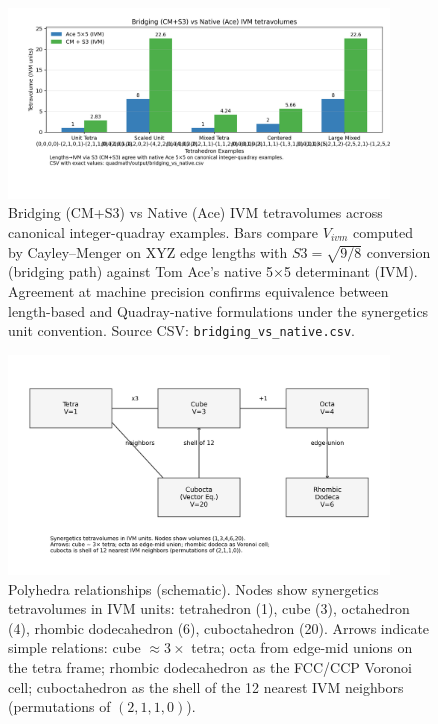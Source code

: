 \documentclass[
  10pt,
]{article}
\begin{document}
\begin{figure}[htbp]
\centering
\includegraphics[width=0.9\textwidth]{figures/bridging_vs_native.png}
\caption{Bridging (CM+S3) vs Native (Ace) IVM tetravolumes across canonical integer-quadray examples. Bars compare $V_{ivm}$ computed by Cayley–Menger on XYZ edge lengths with $S3=\sqrt{9/8}$ conversion (bridging path) against Tom Ace's native 5×5 determinant (IVM). Agreement at machine precision confirms equivalence between length-based and Quadray-native formulations under the synergetics unit convention. Source CSV: \texttt{bridging\_vs\_native.csv}.}
\label{fig:bridging_native}
\end{figure}

\begin{figure}[htbp]
\centering
\includegraphics[width=0.9\textwidth]{figures/polyhedra_quadray_constructions.png}
\caption{Polyhedra relationships (schematic). Nodes show synergetics tetravolumes in IVM units: tetrahedron (1), cube (3), octahedron (4), rhombic dodecahedron (6), cuboctahedron (20). Arrows indicate simple relations: cube $\approx 3\times$ tetra; octa from edge-mid unions on the tetra frame; rhombic dodecahedron as the FCC/CCP Voronoi cell; cuboctahedron as the shell of the 12 nearest IVM neighbors (permutations of $(2,1,1,0)$).}
\label{fig:polyhedra_quadray_map}
\end{figure}
\end{document}
